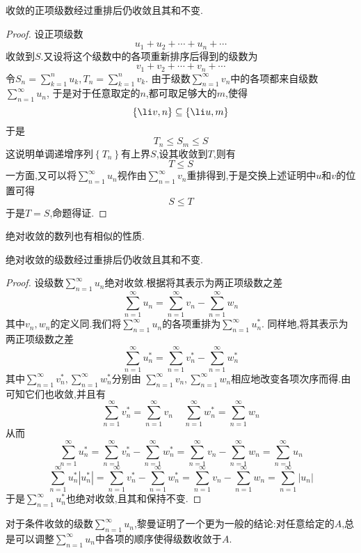 \documentclass{ctexart}
\begin{document}
\begin{formal}[2.4 收敛的正项级数重排后仍收敛]
    收敛的正项级数经过重排后仍收敛且其和不变.
\end{formal}
\begin{proof}
    设正项级数
    \[u_1+u_2+\cdots+u_n+\cdots\]
    收敛到$S$.又设将这个级数中的各项重新排序后得到的级数为
    \[v_1+v_2+\cdots+v_n+\cdots\]
    令$\displaystyle S_n=\sum_{k=1}^{n}u_k,T_n=\sum_{k=1}^{n}v_k$.%
    由于级数$\displaystyle\sum_{n=1}^\infty v_n$中的各项都来自级数$\displaystyle\sum_{n=1}^\infty u_n$,%
    于是对于任意取定的$n$,都可取足够大的$m$,使得
    \[\left\{\li v,n\right\}\subseteq\left\{\li u,m\right\}\]
    于是
    \[T_n\leqslant S_m\leqslant S\]
    这说明单调递增序列$\left\{T_n\right\}$有上界$S$,设其收敛到$T$,则有
    \[T\leqslant S\]
    一方面,又可以将$\displaystyle\sum_{n=1}^\infty u_n$视作由$\displaystyle\sum_{n=1}^\infty v_n$重排得到,于是交换上述证明中$u$和$v$的位置可得
    \[S\leqslant T\]
    于是$T=S$,命题得证.
\end{proof}\noindent
绝对收敛的数列也有相似的性质.
\begin{formal}[2.5 绝对收敛的级数重排后仍收敛]
    绝对收敛的级数经过重排后仍收敛且其和不变.
\end{formal}
\begin{proof}
    设级数$\displaystyle\sum_{n=1}^\infty u_n$绝对收敛.根据将其表示为两正项级数之差
    \[\sum_{n=1}^\infty u_n=\sum_{n=1}^\infty v_n-\sum_{n=1}^\infty w_n\]
    其中$v_n,w_n$的定义同.我们将$\displaystyle\sum_{n=1}^\infty u_n$的各项重排为$\displaystyle\sum_{n=1}^\infty u_n^*$.%
    同样地,将其表示为两正项级数之差
    \[\sum_{n=1}^\infty u_n^*=\sum_{n=1}^\infty v_n^*-\sum_{n=1}^\infty w_n^*\]
    其中$\displaystyle\sum_{n=1}^\infty v_n^*,\sum_{n=1}^\infty w_n^*$分别由%
    $\sum_{n=1}^\infty v_n,\sum_{n=1}^\infty w_n$相应地改变各项次序而得.由可知它们也收敛,并且有
    \[\sum_{n=1}^\infty v_n^*=\sum_{n=1}^\infty v_n\ \ \ \ \ \sum_{n=1}^\infty w_n^*=\sum_{n=1}^\infty w_n\]
    从而
    \[\sum_{n=1}^\infty u_n^*=\sum_{n=1}^\infty v_n^*-\sum_{n=1}^\infty w_n^*=\sum_{n=1}^\infty v_n-\sum_{n=1}^\infty w_n=\sum_{n=1}^\infty u_n\]
    \[\sum_{n=1}^\infty u_n^*\left|u_n^*\right|=\sum_{n=1}^\infty v_n^*-\sum_{n=1}^\infty w_n^*=\sum_{n=1}^\infty v_n-\sum_{n=1}^\infty w_n=\sum_{n=1}^\infty \left|u_n\right|\]
    于是$\displaystyle\sum_{n=1}^\infty u_n^*$也绝对收敛,且其和保持不变.
\end{proof}\noindent
对于条件收敛的级数$\displaystyle\sum_{n=1}^\infty u_n$,黎曼证明了一个更为一般的结论:对任意给定的$A$,总是可以调整$\displaystyle\sum_{n=1}^\infty u_n$中各项的顺序使得级数收敛于$A$.\\
\end{document}

